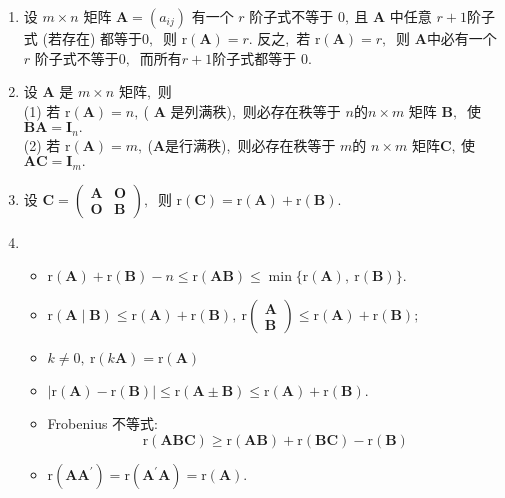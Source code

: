 \begin{enumerate}
		\item 设 $ m \times n $ 矩阵 $ \boldsymbol{A}=\left(a_{i j}\right) $ 有一个  $r$  阶子式不等于 $0 ,\  $且  $\boldsymbol{A}$  中任意  $r+1  $阶子式 (若存在) 都等于$ 0 ,\ $ 则  $\mathrm{r}(\boldsymbol{A})=r .$ 反之,\  若  $\mathrm{r}(\boldsymbol{A})=r ,\ $ 则  $\boldsymbol{A}  $中必有一个  $r$  阶子式不等于$ 0 ,\ $ 而所有$  r+1  $阶子式都等于 $0 .$
		\item 设 $ \boldsymbol{A}$  是  $m \times n $ 矩阵,\  则\\
		(1) 若  $\mathrm{r}(\boldsymbol{A})=n ,\  $( $ \boldsymbol{A} $ 是列满秩),\  则必存在秩等于  $n  $的$  n \times m$  矩阵  $\boldsymbol{B} ,\ $ 使$  \boldsymbol{B} \boldsymbol{A}=\boldsymbol{I}_{n} .$\\
		(2) 若 $ \mathrm{r}(\boldsymbol{A})=m ,\  $($  \boldsymbol{A}  $是行满秩),\  则必存在秩等于 $ m  $的  $n \times m $ 矩阵$ \boldsymbol{C} ,\  $使  $\boldsymbol{AC}=\boldsymbol{I}_{m} .$
		\item 设 $ \boldsymbol{C}=\left(\begin{array}{ll}\boldsymbol{A} & \boldsymbol{O} \\ \boldsymbol{O} & \boldsymbol{B}\end{array}\right) ,\ $ 则  $\mathrm{r}(\boldsymbol{C})=\mathrm{r}(\boldsymbol{A})+\mathrm{r}(\boldsymbol{B}) .$
		\item 
		\begin{itemize}
			\item $\mathrm{r}(\boldsymbol{A})+\mathrm{r}(\boldsymbol{B})-n \leqslant \mathrm{r}(\boldsymbol{A} \boldsymbol{B}) \leqslant \min \{\mathrm{r}(\boldsymbol{A}),\  \mathrm{r}(\boldsymbol{B})\} .$
			\item $\mathrm{r}(\boldsymbol{A} \mid \boldsymbol{B}) \leqslant \mathrm{r}(\boldsymbol{A})+\mathrm{r}(\boldsymbol{B}),\  \mathrm{r}\left(\begin{array}{l}\boldsymbol{A} \\ \boldsymbol{B}\end{array}\right) \leqslant \mathrm{r}(\boldsymbol{A})+\mathrm{r}(\boldsymbol{B}) ;$
			\item $k \neq 0,\  \mathrm{r}(k \boldsymbol{A})=\mathrm{r}(\boldsymbol{A}) $
			\item $|\mathrm{r}(\boldsymbol{A})-\mathrm{r}(\boldsymbol{B})| \leqslant \mathrm{r}(\boldsymbol{A} \pm \boldsymbol{B}) \leqslant \mathrm{r}(\boldsymbol{A})+\mathrm{r}(\boldsymbol{B}) .$
			\item  Frobenius 不等式:		
			$$\mathrm{r}(\boldsymbol{A B C}) \geqslant \mathrm{r}(\boldsymbol{A B})+\mathrm{r}(\boldsymbol{B C})-\mathrm{r}(\boldsymbol{B})$$
			\item  $\mathrm{r}\left(\boldsymbol{A} \boldsymbol{A}^{\prime}\right)=\mathrm{r}\left(\boldsymbol{A}^{\prime} \boldsymbol{A}\right)=\mathrm{r}(\boldsymbol{A}) .$
		\end{itemize}
		

\end{enumerate}
